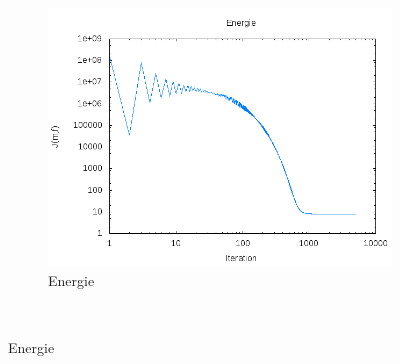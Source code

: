 \documentclass{beamer}
\begin{document}
\begin{frame}
\begin{figure}[!h]
\begin{subfigure}[b]{0.35\linewidth}
	\includegraphics[width=\textwidth]{img/2DMixture/energie.png}
	\caption{Energie}
	\end{subfigure}
	~
	

\end{figure}
\end{frame}
\end{document}
